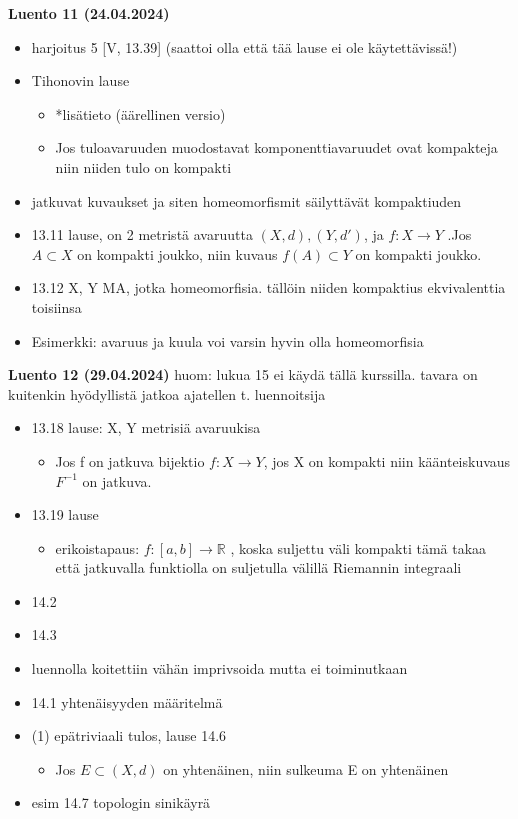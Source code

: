 \documentclass[12pt,a4paper,leqno]{amsart}
\begin{document}
\textbf{Luento 11 (24.04.2024)}
\begin{itemize}
    \item harjoitus 5 [V, 13.39] (saattoi olla että tää lause ei ole käytettävissä!)
    \item Tihonovin lause
    \begin{itemize}
        \item *lisätieto (äärellinen versio)
        \item Jos tuloavaruuden muodostavat komponenttiavaruudet ovat kompakteja niin niiden tulo on kompakti
    \end{itemize}
    \item jatkuvat kuvaukset ja siten homeomorfismit säilyttävät kompaktiuden
    \item 13.11 lause, on 2 metristä avaruutta $(X, d), (Y, d')$, ja $f: X \to Y$ .Jos $A \subset X$ on kompakti joukko, niin kuvaus $f(A) \subset Y$ on kompakti joukko.
    \item 13.12 X, Y MA, jotka homeomorfisia. tällöin niiden kompaktius ekvivalenttia toisiinsa
    \item Esimerkki: avaruus ja kuula voi varsin hyvin olla homeomorfisia
\end{itemize}
\textbf{Luento 12 (29.04.2024)}
huom: lukua 15 ei käydä tällä kurssilla. tavara on kuitenkin hyödyllistä jatkoa ajatellen t. luennoitsija
\begin{itemize}
    \item 13.18 lause: X, Y metrisiä avaruukisa
    \begin{itemize}
        \item Jos f on jatkuva bijektio $f: X \to Y$, jos X on kompakti niin käänteiskuvaus $F^{-1}$ on jatkuva.
    \end{itemize}
    \item 13.19 lause
    \begin{itemize}
        \item erikoistapaus: $f: [a, b] \to \mathbb{R}$ , koska suljettu väli kompakti tämä takaa että jatkuvalla funktiolla on suljetulla välillä Riemannin integraali
    \end{itemize}
\item 14.2
\item 14.3
\item luennolla koitettiin vähän imprivsoida mutta ei toiminutkaan
\item 14.1 yhtenäisyyden määritelmä
\item (1) epätriviaali tulos, lause 14.6
\begin{itemize}
    \item Jos $E \subset (X, d)$ on yhtenäinen, niin sulkeuma E on yhtenäinen
\end{itemize}
\item esim 14.7 topologin sinikäyrä
\end{itemize}
\end{document}
